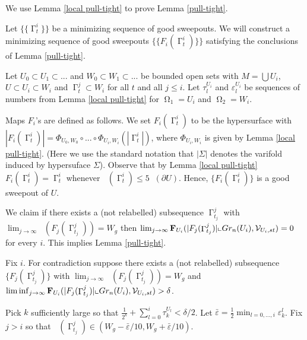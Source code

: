 \documentclass[12pt]{amsart}
\DeclareMathOperator{\Hn}{\mathcal{H}^n}
\DeclareMathOperator{\G}{\Gamma}
\DeclareMathOperator{\Om}{\Omega}
\newcommand{\Cgs}{5 \Hn(\partial U)}
\theoremstyle{definition}
\begin{document}
We use Lemma \ref*{local pull-tight}
to prove Lemma \ref*{pull-tight}.


Let $\{\{ \G_{t}^i \}\}$ be a minimizing
sequence of good sweepouts.
We will construct a minimizing sequence
of good sweepouts 
$\{\{ F_i(\G_{t}^i) \}\}$ satisfying the
conclusions of Lemma \ref*{pull-tight}.

Let $U_0 \subset U_1 \subset ...$ and $W_0 \subset W_1 \subset ...$
be bounded open sets with
$M = \bigcup U_i$, $U \subset U_i \subset W_i$ and
$\G_{t}^j \subset W_i$ for all $t$ and all $j \leq i$. 
Let $\tau^{U_i}_l$ and $\varepsilon^{U_i}_l$ be sequences
of numbers from Lemma \ref*{local pull-tight}
for $\Om_1 = U_i$ and $\Om_2 = W_i$.

Maps $F_i$'s are defined as follows.
We set $F_i(\G_{t}^i)$ to be the hypersurface
with $|F_i(\G_{t}^i)| = 
\Phi_{U_0,W_0} \circ ... \circ \Phi_{U_i,W_i}(|\G_{t}^i|)$,
where $\Phi_{U_i,W_i}$ is given by Lemma \ref*{local pull-tight}.
(Here we use the standard notation
that $|\Sigma|$ denotes the varifold induced
by hypersuface $\Sigma$).
Observe that by Lemma \ref*{local pull-tight}
$F_i(\G_{t}^i) = \G_{t}^i$ whenever $\Hn(\G_{t}^i) \leq \Cgs$.
Hence, $\{F_i(\G_{t}^i)\}$ is a good sweepout of $U$.

We claim 
if there exists a (not relabelled) subsequence
$\G_{t_j}^j$ with
$\lim_{j \rightarrow \infty} \Hn(F_j(\G_{t_j}^j)) 
= W_g$ then $\lim_{j \rightarrow \infty} 
{\bf F}_{U_i} (|F_j(\G_{t_j}^j)| \llcorner Gr_n(U_i),
\mathcal{V}_{U_i,st}) = 0$ for every $i$.
This implies Lemma \ref*{pull-tight}.

Fix $i$. For contradiction suppose there exists a 
(not relabelled)
subsequence $\{ F_j(\G_{t_j}^j) \}$ with 
$\lim_{j \rightarrow \infty} \Hn(F_j(\G_{t_j}^j)) 
= W_g$ and $\liminf_{j \rightarrow \infty} {\bf F}_{U_i}
(|F_j(\G_{t_j}^j)| \llcorner Gr_n(U_i),
\mathcal{V}_{U_i,st}) > \delta$.


Pick $k$ sufficiently large
so that $\frac{1}{2^k} + \sum_{l=0}^i \tau_k^{U_l}
< \delta/2$.
Let $\bar{\varepsilon} = \frac{1}{2} \min_{l=0,...,i} 
{\varepsilon^{l}_k}$.
Fix $j > i$ so that
$\Hn (\G_{t_j}^j) \in (W_g - \bar{\varepsilon}/10,
W_g + \bar{\varepsilon}/10)$. 
\end{document}
